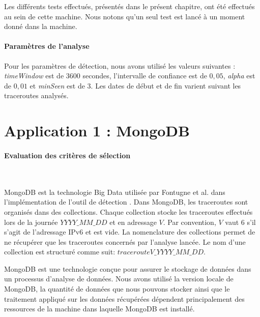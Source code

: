 Les différents tests effectués, présentés dans le présent chapitre, ont été effectués  au sein de cette machine. Nous notons qu'un seul test est lancé à un moment donné dans la machine.
\paragraph{Paramètres de l'analyse} Pour les paramètres de détection, nous avons utilisé les valeurs suivantes : \textit{timeWindow} est de $ 3600 $ secondes, l'intervalle de confiance est de $0,05$, \textit{alpha} est de $ 0,01 $ et \textit{minSeen} est de $3$. Les dates de début et de fin  varient suivant les traceroutes analysés.



\section{Application 1 : MongoDB} \label{mongodb-impleme}


\paragraph{Evaluation des critères de sélection}~

MongoDB est la technologie Big Data utilisée par  Fontugne et al.  dans l'implémentation de l'outil de détection \cite{InternetHealthReport}. Dans MongoDB, les traceroutes sont organisés  dans des collections.  Chaque collection stocke les traceroutes effectués lors de la journée $YYYY\_MM\_DD$ et en adressage $V$. Par convention,  $V$  vaut $6$ s'il s'agit de l'adressage IPv6 et est vide.  La nomenclature  des collections permet de ne récupérer que les traceroutes concernés par l'analyse lancée. Le nom d'une collection est structuré comme suit: 	$tracerouteV\_YYYY\_MM\_DD$.
 

 
MongoDB est une technologie conçue pour assurer  le stockage de données dans un processus d'analyse de données. Nous avons utilisé la version locale de MongoDB, la quantité de données que nous pouvons stocker ainsi que le traitement appliqué sur les données récupérées dépendent principalement des ressources de la machine dans laquelle MongoDB est installé.
 
